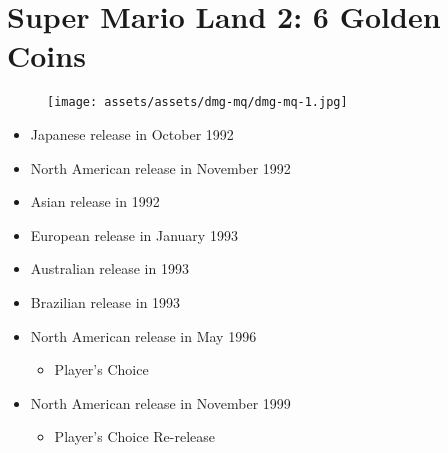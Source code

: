 \documentclass{book}
\begin{document}
\begingroup \chapter*{Super Mario Land 2: 6 Golden Coins} \endgroup
\begin{figure}[H]
\vskip 4pt
\centering
\texttt{[image: assets/assets/dmg-mq/dmg-mq-1.jpg]}\end{figure}
\begin{itemize} [nosep]




\item Japanese release in October 1992







\item North American release in November 1992







\item Asian release in 1992







\item European release in January 1993







\item Australian release in 1993







\item Brazilian release in 1993







\item North American release in May 1996
\begin{itemize} [nosep]\item Player’s Choice\end{itemize}\noindent






\item North American release in November 1999
\begin{itemize} [nosep]\item Player’s Choice Re-release\end{itemize}\noindent







\end{itemize}
\end{document}
